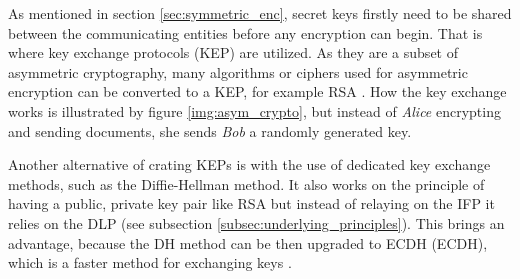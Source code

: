 As mentioned in section \ref{sec:symmetric_enc}, secret keys firstly need to be shared between the communicating entities before any encryption can begin. That is where key exchange protocols (KEP) are utilized. As they are a subset of asymmetric cryptography, many algorithms or ciphers used for asymmetric encryption can be converted to a KEP, for example RSA \cite{Ristic2014}. How the key exchange works is illustrated by figure \ref{img:asym_crypto}, but instead of \textit{Alice} encrypting and sending documents, she sends \textit{Bob} a randomly generated key.

Another alternative of crating KEPs is with the use of dedicated key exchange methods, such as the Diffie-Hellman method. It also works on the principle of having a public, private key pair like RSA but instead of relaying on the IFP it relies on the DLP (see subsection \ref{subsec:underlying_principles}). This brings an advantage, because the DH method can be then upgraded to \acl{ECDH} (ECDH), which is a faster method for exchanging keys \cite{Ristic2014}.
